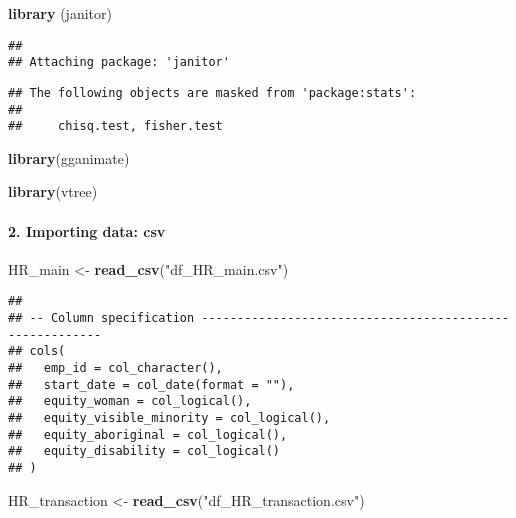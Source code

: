 \documentclass[
]{article}
\newenvironment{Shaded}{\begin{snugshade}}{\end{snugshade}}
\newcommand{\KeywordTok}[1]{\textcolor[rgb]{0.13,0.29,0.53}{\textbf{#1}}}
\newcommand{\NormalTok}[1]{#1}
\newcommand{\StringTok}[1]{\textcolor[rgb]{0.31,0.60,0.02}{#1}}
\begin{document}
\begin{Shaded}
\begin{Highlighting}[]
\KeywordTok{library}\NormalTok{ (janitor)}
\end{Highlighting}
\end{Shaded}

\begin{verbatim}
## 
## Attaching package: 'janitor'
\end{verbatim}

\begin{verbatim}
## The following objects are masked from 'package:stats':
## 
##     chisq.test, fisher.test
\end{verbatim}

\begin{Shaded}
\begin{Highlighting}[]
\KeywordTok{library}\NormalTok{(gganimate)}


\KeywordTok{library}\NormalTok{(vtree)}
\end{Highlighting}
\end{Shaded}

\hypertarget{importing-data-csv}{%
\paragraph{2. Importing data: csv}\label{importing-data-csv}}

\begin{Shaded}
\begin{Highlighting}[]
\NormalTok{HR\_main \textless{}{-}}\StringTok{ }\KeywordTok{read\_csv}\NormalTok{(}\StringTok{"df\_HR\_main.csv"}\NormalTok{)}
\end{Highlighting}
\end{Shaded}

\begin{verbatim}
## 
## -- Column specification --------------------------------------------------------
## cols(
##   emp_id = col_character(),
##   start_date = col_date(format = ""),
##   equity_woman = col_logical(),
##   equity_visible_minority = col_logical(),
##   equity_aboriginal = col_logical(),
##   equity_disability = col_logical()
## )
\end{verbatim}

\begin{Shaded}
\begin{Highlighting}[]
\NormalTok{HR\_transaction \textless{}{-}}\StringTok{ }\KeywordTok{read\_csv}\NormalTok{(}\StringTok{"df\_HR\_transaction.csv"}\NormalTok{)}
\end{Highlighting}
\end{Shaded}
\end{document}
